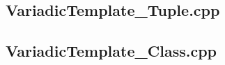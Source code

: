 \documentclass[11pt]{report}
\begin{document}
\begin{appendix}
\subsection{VariadicTemplate\_Tuple.cpp}
\label{VariadicTemplate_Tuple}


\subsection{VariadicTemplate\_Class.cpp}
\label{VariadicTemplate_Class}



\end{appendix}
\end{document}

